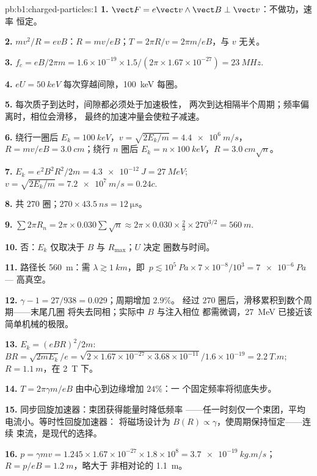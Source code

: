 \begin{solution}{pb:b1:charged-particles:1}
\textbf{1.} $\vect F = e\vect v\wedge\vect B \perp \vect v$：不做功，速率
恒定。

\textbf{2.} $mv^2/R = evB$：$R = mv/eB$；$T = 2\pi R/v = 2\pi m/eB$，与
$v$ 无关。

\textbf{3.} $f_c = eB/2\pi m = 1.6\times10^{-19} \times 1.5/(2\pi \times 1.67
\times10^{-27}) = \qty{23}{MHz}$.

\textbf{4.} $eU = \qty{50}{keV}$ 每次穿越间隙，\qty{100}{keV} 每圈。

\textbf{5.} 每次质子到达时，间隙都必须处于加速极性，
两次到达相隔半个周期；频率偏离时，相位会滑移，
最终的加速冲量会使粒子减速。

\textbf{6.} 绕行一圈后 $E_k = \qty{100}{keV}$，$v = \sqrt{2E_k/m} =
\qty{4.4e6}{m/s}$，$R = mv/eB = \qty{3.0}{cm}$；绕行 $n$ 圈后 $E_k =
n \times \qty{100}{keV}$，$R = \qty{3.0}{cm}\sqrt n$。

\textbf{7.} $E_k = e^2B^2R^2/2m = \qty{4.3e-12}{J} = \qty{27}{MeV}$; $v =
\sqrt{2E_k/m} = \qty{7.2e7}{m/s} = 0.24c$.

\textbf{8.} 共 $270$ 圈；$270 \times \qty{43.5}{ns} = \qty{12}{\micro s}$。

\textbf{9.} $\sum 2\pi R_n = 2\pi \times 0.030\sum\sqrt n \approx 2\pi \times 0.030
\times \tfrac23 \times 270^{3/2} = \qty{560}{m}$.

\textbf{10.} 否：$E_k$ 仅取决于 $B$ 与 $R_{\max}$；$U$ 决定
圈数与时间。

\textbf{11.} 路径长 \qty{560}{m}：需 $\lambda \gtrsim \qty{1}{km}$，即\
$p \lesssim 10^5\ \unit{Pa} \times 7\times10^{-8}/10^3 = \qty{7e-6}{Pa}$ ---
高真空。

\textbf{12.} $\gamma - 1 = 27/938 = 0.029$；周期增加 $2.9\%$。
经过 $270$ 圈后，滑移累积到数个周期——末尾几圈
将失去同相；实际中 $B$ 与注入相位
都需微调，\qty{27}{MeV} 已接近该简单机械的极限。

\textbf{13.} $E_k = (eBR)^2/2m$: $BR = \sqrt{2mE_k}/e = \sqrt{2 \times 1.67\times
10^{-27} \times 3.68\times10^{-11}}/1.6\times10^{-19} = \qty{2.2}{T.m}$; $R =
\qty{1.1}{m}$，在 \qty{2}{T} 下。

\textbf{14.} $T = 2\pi\gamma m/eB$ 由中心到边缘增加 $24\%$：一
个固定频率将彻底失步。

\textbf{15.} 同步回旋加速器：束团获得能量时降低频率
——任一时刻仅一个束团，平均电流小。等时性回旋加速器：
将磁场设计为 $B(R) \propto \gamma$，使周期保持恒定——连续
束流，是现代的选择。

\textbf{16.} $p = \gamma mv = 1.245 \times 1.67\times10^{-27} \times 1.8\times10^8
= \qty{3.7e-19}{kg.m/s}$；$R = p/eB = \qty{1.2}{m}$，略大于
非相对论的 \qty{1.1}{m}。


\end{solution}

